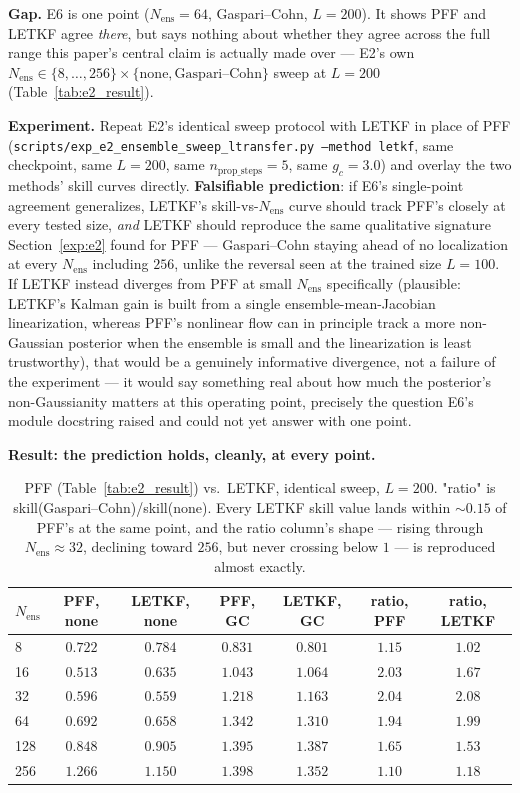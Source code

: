 \documentclass[11pt]{article}
\begin{document}
\textbf{Gap.} E6 is one point ($N_{\mathrm{ens}}=64$, Gaspari--Cohn,
$L=200$). It shows PFF and LETKF agree \emph{there}, but says nothing
about whether they agree across the full range this paper's central
claim is actually made over --- E2's own $N_{\mathrm{ens}}\in
\{8,\dots,256\}\times\{\text{none},\text{Gaspari--Cohn}\}$ sweep at
$L=200$ (Table~\ref{tab:e2_result}).

\textbf{Experiment.} Repeat E2's identical sweep protocol with LETKF
in place of PFF (\texttt{scripts/exp\_e2\_ensemble\_sweep\_ltransfer.py
--method letkf}, same checkpoint, same $L=200$, same
$n_{\mathrm{prop\_steps}}=5$, same $g_c=3.0$) and overlay the two
methods' skill curves directly. \textbf{Falsifiable prediction}: if
E6's single-point agreement generalizes, LETKF's
skill-vs-$N_{\mathrm{ens}}$ curve should track PFF's closely at every
tested size, \emph{and} LETKF should reproduce the same qualitative
signature Section~\ref{exp:e2} found for PFF --- Gaspari--Cohn staying
ahead of no localization at every $N_{\mathrm{ens}}$ including $256$,
unlike the reversal seen at the trained size $L=100$. If LETKF instead
diverges from PFF at small $N_{\mathrm{ens}}$ specifically (plausible:
LETKF's Kalman gain is built from a single ensemble-mean-Jacobian
linearization, whereas PFF's nonlinear flow can in principle track a
more non-Gaussian posterior when the ensemble is small and the
linearization is least trustworthy), that would be a genuinely
informative divergence, not a failure of the experiment --- it would
say something real about how much the posterior's non-Gaussianity
matters at this operating point, precisely the question E6's module
docstring raised and could not yet answer with one point.

\textbf{Result: the prediction holds, cleanly, at every point.}

\begin{table}[h]
\centering
\begin{tabular}{lcccccc}
\toprule
$N_{\mathrm{ens}}$ & PFF, none & LETKF, none & PFF, GC & LETKF, GC & ratio, PFF & ratio, LETKF \\
\midrule
8   & $0.722$ & $0.784$ & $0.831$ & $0.801$ & $1.15$ & $1.02$ \\
16  & $0.513$ & $0.635$ & $1.043$ & $1.064$ & $2.03$ & $1.67$ \\
32  & $0.596$ & $0.559$ & $1.218$ & $1.163$ & $2.04$ & $2.08$ \\
64  & $0.692$ & $0.658$ & $1.342$ & $1.310$ & $1.94$ & $1.99$ \\
128 & $0.848$ & $0.905$ & $1.395$ & $1.387$ & $1.65$ & $1.53$ \\
256 & $1.266$ & $1.150$ & $1.398$ & $1.352$ & $1.10$ & $1.18$ \\
\bottomrule
\end{tabular}
\caption{PFF (Table~\ref{tab:e2_result}) vs.\ LETKF, identical sweep,
$L=200$. "ratio" is skill(Gaspari--Cohn)/skill(none). Every LETKF skill
value lands within $\sim0.15$ of PFF's at the same point, and the
ratio column's shape --- rising through $N_{\mathrm{ens}}\approx32$,
declining toward $256$, but never crossing below $1$ --- is reproduced
almost exactly.}
\label{tab:e7_result}
\end{table}
\end{document}

